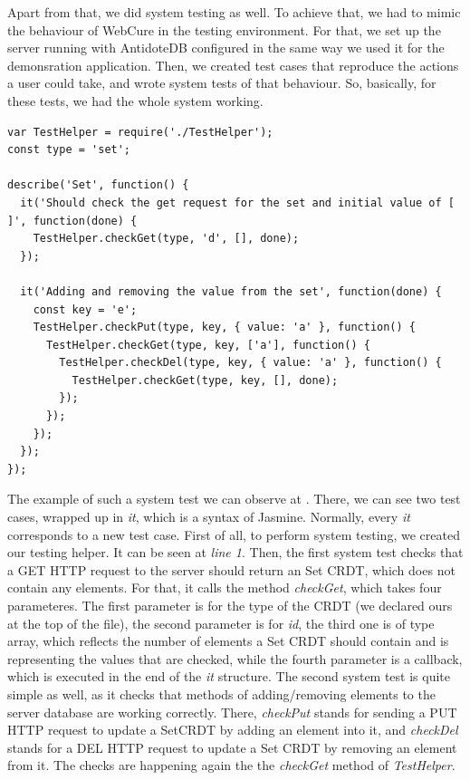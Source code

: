 Apart from that, we did system testing as well. To achieve that, we had to mimic the behaviour of WebCure in the testing environment. For that, we set up the server running with AntidoteDB configured in the same way we used it for the demonsration application. Then, we created test cases that reproduce the actions a user could take, and wrote system tests of that behaviour. So, basically, for these tests, we had the whole system working. 

\begin{lstlisting}[caption={[System test example for WebCure] Simple system test that checks different actions performed on \textit{SetCRDT}.}, label={lst:ev2}]
var TestHelper = require('./TestHelper');
const type = 'set';

describe('Set', function() {
  it('Should check the get request for the set and initial value of [ ]', function(done) {
    TestHelper.checkGet(type, 'd', [], done);
  });

  it('Adding and removing the value from the set', function(done) {
    const key = 'e';
    TestHelper.checkPut(type, key, { value: 'a' }, function() {
      TestHelper.checkGet(type, key, ['a'], function() {
        TestHelper.checkDel(type, key, { value: 'a' }, function() {
          TestHelper.checkGet(type, key, [], done);
        });
      });
    });
  });
});
\end{lstlisting}

The example of such a system test we can observe at . There, we can see two test cases, wrapped up in \textit{it}, which is a syntax of Jasmine. Normally, every \textit{it} corresponds to a new test case. First of all, to perform system testing, we created our testing helper. It can be seen at \textit{line 1}. Then, the first system test checks that a GET HTTP request to the server should return an Set CRDT, which does not contain any elements. For that, it calls the method \textit{checkGet}, which takes four parameteres. The first parameter is for the type of the CRDT (we declared ours at the top of the file), the second parameter is for \textit{id}, the third one is of type array, which reflects the number of elements a Set CRDT should contain and is representing the values that are checked, while the fourth parameter is a callback, which is executed in the end of the \textit{it} structure. The second system test is quite simple as well, as it checks that methods of adding/removing elements to the server database are working correctly. There, \textit{checkPut} stands for sending a PUT HTTP request to update a SetCRDT by adding an element into it, and \textit{checkDel} stands for a DEL HTTP request to update a Set CRDT by removing an element from it. The checks are happening again the the \textit{checkGet} method of \textit{TestHelper}.

